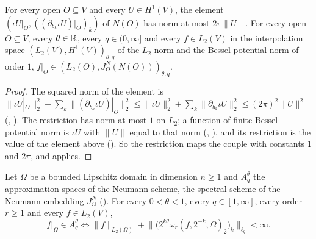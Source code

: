 \begin{lemma}
\label{lem:neumann-restriction-couple}
\leanok
{}
For every open $O \subseteq V$ and every $U \in H^1(V)$, the element
$(\iota U|_O, ((\partial_{b_k} \iota U)|_O)_k)$ of $N(O)$ has norm at most $2\pi \|U\|$. For every
open $O \subseteq V$, every $\theta \in \mathbb{R}$, every $q \in (0, \infty]$ and every $f \in L_2(V)$ in
the interpolation space
$(L_2(V), H^1(V))_{\theta, q}$ of the $L_2$ norm and the Bessel potential norm of order $1$,
$f|_O \in (L_2(O), J^N_O(N(O)))_{\theta, q}$.
\end{lemma}

\begin{proof}
\leanok
The squared norm of the element is
$\|\iota U|_O\|_2^2 + \sum_k \|(\partial_{b_k} \iota U)|_O\|_2^2 \leq \|\iota U\|_2^2
+ \sum_k \|\partial_{b_k} \iota U\|_2^2 \leq (2\pi)^2 \|U\|^2$
(, ). The restriction has norm
at most $1$ on $L_2$; a function of finite Bessel potential norm is $\iota U$ with $\|U\|$ equal to
that norm (, ), and its restriction
is the value of the element above (). So the restriction maps the couple
with constants $1$ and $2\pi$, and  applies.
\end{proof}

\begin{theorem}
\label{thm:spectral-besov-neumann}
\leanok
{}
Let $\Omega$ be a bounded Lipschitz domain in dimension $n \geq 1$ and $A^\theta_q$ the
approximation spaces of the Neumann scheme, the spectral scheme of the Neumann embedding
$J^N_\Omega$ (). For every
$0 < \theta < 1$, every $q \in [1, \infty]$, every order $r \geq 1$ and every $f \in L_2(V)$,
\[
  f|_\Omega \in A^\theta_q \iff
  \|f\|_{L_2(\Omega)} + \bigl\| \bigl(2^{k\theta} \omega_r(f, 2^{-k}, \Omega)_2\bigr)_k
    \bigr\|_{\ell_q} < \infty .
\]
\end{theorem}

